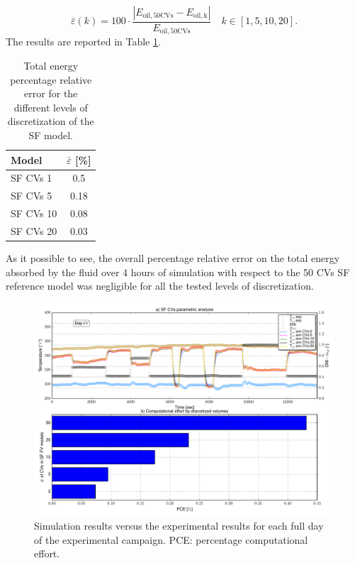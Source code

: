 \documentclass[final,3p,times,review]{elsarticle}
\begin{document}
%
\begin{equation}
\bar{\varepsilon}(k) = 100 \cdot \frac{|E_\mathrm{oil,50CVs} -E_\mathrm{oil,k}|}{E_\mathrm{oil,50CVs}}  \quad k \in [1,5,10,20]. 
\end{equation}
%
The results are reported in Table \ref{tab:SF_Etot}.
%
\begin{table}[h!]
  \centering
  \caption{Total energy percentage relative error for the different levels of discretization of the SF model.}
    \begin{tabular}{lc}
    \toprule
    Model & \multicolumn{1}{c}{$\bar{\varepsilon}$ [\%]}  \\
    \midrule
    SF CVs 1      & 0.5         \\
    SF CVs 5      & 0.18         \\
    SF CVs 10     & 0.08          \\
    SF CVs 20     & 0.03          \\   
    \bottomrule
    \end{tabular}%
  \label{tab:SF_Etot}%
\end{table}%
%
As it possible to see, the overall percentage relative error on the total energy absorbed by the fluid over 4 hours of simulation with respect to the 50 CVs SF reference model was negligible for all the tested levels of discretization.\\

\begin{landscape}
\begin{figure}[h!]
\centering
\includegraphics[height=0.95\textheight]{Figures/_SF_NodesParaALL.pdf}
\caption{Simulation results versus the experimental results for each full day of the experimental campaign. PCE: percentage computational effort.}
\label{fig:SF_ModRes_ParAnalysis}
\end{figure}
\end{landscape}
%
%
%
\end{document}

